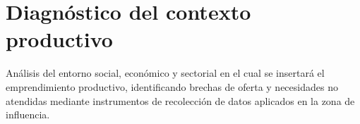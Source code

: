 \section{Diagnóstico del contexto productivo}
\label{sec:diagnostico_contexto}

Análisis del entorno social, económico y sectorial en el cual se insertará el emprendimiento productivo, identificando brechas de oferta y necesidades no atendidas mediante instrumentos de recolección de datos aplicados en la zona de influencia.
